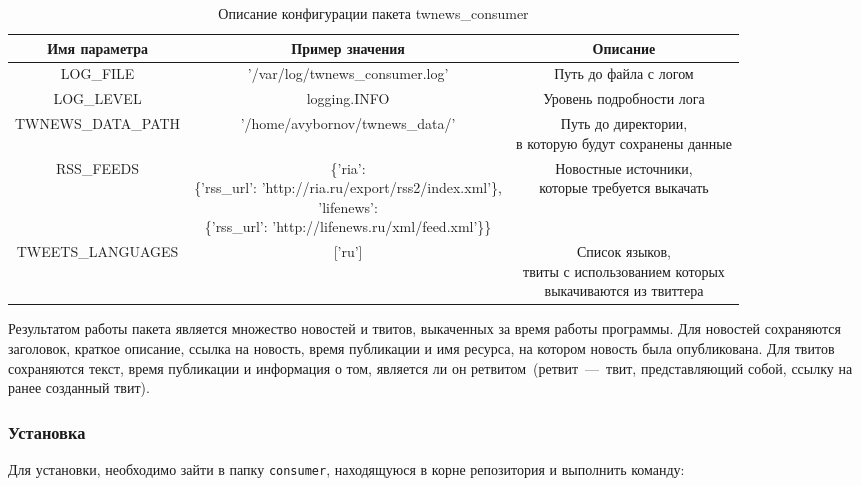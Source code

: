         \begin{table}[h!]
            \small
            \caption{Описание конфигурации пакета twnews\_consumer \bigskip}
            \centering

            \begin{sideways}
            \label{tabular:consumer_config}
            \begin{tabular}{|c|c|c|}
                \hline
                \bf{Имя параметра} & \bf{Пример значения} & \bf{Описание} \\ \hline
                LOG\_FILE & '/var/log/twnews\_consumer.log' & Путь до файла с логом \\ \hline
                LOG\_LEVEL & logging.INFO & Уровень подробности лога \\ \hline
                TWNEWS\_DATA\_PATH & '/home/avybornov/twnews\_data/' & \specialcell{Путь до директории, \\ в которую будут сохранены данные} \\ \hline
                RSS\_FEEDS & \specialcell{\{'ria': \\ \{'rss\_url': 'http://ria.ru/export/rss2/index.xml'\},\\ 'lifenews': \\ \{'rss\_url': 'http://lifenews.ru/xml/feed.xml'\}\}} & \specialcell{Новостные источники, \\ которые требуется выкачать}\\ \hline
                TWEETS\_LANGUAGES & ['ru'] & \specialcell{Список языков, \\ твиты с использованием которых \\ выкачиваются из твиттера} \\ \hline
            \end{tabular}
        \end{sideways}
        \end{table}

        Результатом работы пакета является множество новостей и твитов, выкаченных за время работы программы. Для новостей сохраняются заголовок, краткое описание, ссылка на новость, время публикации и имя ресурса, на котором новость была опубликована. Для твитов сохраняются текст, время публикации и информация о том, является ли он ретвитом~(ретвит~---~твит, представляющий собой, ссылку на ранее созданный твит).

        \subsubsection{Установка}
            Для установки, необходимо зайти в папку \lstinline{consumer}, находящуюся в корне репозитория и выполнить команду:

